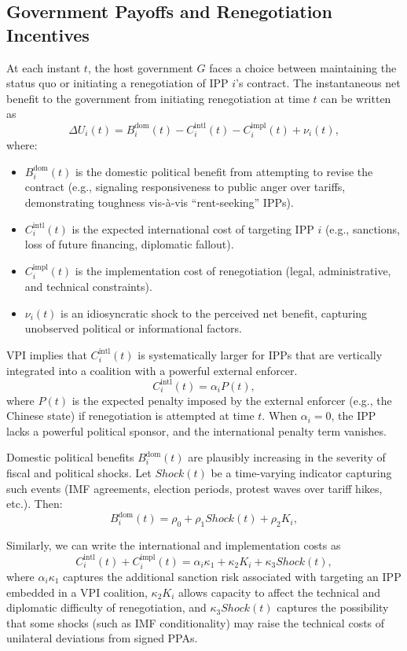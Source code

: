 \documentclass[12pt]{article}
\begin{document}
\subsection*{Government Payoffs and Renegotiation Incentives}

At each instant $t$, the host government $G$ faces a choice between maintaining the status quo or initiating a renegotiation of IPP $i$'s contract. The instantaneous net benefit to the government from initiating renegotiation at time $t$ can be written as
\[
  \Delta U_i(t) 
  = B^{\text{dom}}_i(t) - C^{\text{intl}}_i(t) - C^{\text{impl}}_i(t) + \nu_i(t),
\]
where:
\begin{itemize}
  \item $B^{\text{dom}}_i(t)$ is the domestic political benefit from attempting to revise the contract (e.g., signaling responsiveness to public anger over tariffs, demonstrating toughness vis-à-vis ``rent-seeking'' IPPs).
  \item $C^{\text{intl}}_i(t)$ is the expected international cost of targeting IPP $i$ (e.g., sanctions, loss of future financing, diplomatic fallout).
  \item $C^{\text{impl}}_i(t)$ is the implementation cost of renegotiation (legal, administrative, and technical constraints).
  \item $\nu_i(t)$ is an idiosyncratic shock to the perceived net benefit, capturing unobserved political or informational factors.
\end{itemize}

VPI implies that $C^{\text{intl}}_i(t)$ is systematically larger for IPPs that are vertically integrated into a coalition with a powerful external enforcer.
\[
  C^{\text{intl}}_i(t) = \alpha_i P(t),
\]
where $P(t)$ is the expected penalty imposed by the external enforcer (e.g., the Chinese state) if renegotiation is attempted at time $t$. When $\alpha_i = 0$, the IPP lacks a powerful political sponsor, and the international penalty term vanishes.

Domestic political benefits $B^{\text{dom}}_i(t)$ are plausibly increasing in the severity of fiscal and political shocks. Let $Shock(t)$ be a time-varying indicator capturing such events (IMF agreements, election periods, protest waves over tariff hikes, etc.). Then:
\[
  B^{\text{dom}}_i(t) = \rho_0 + \rho_1 Shock(t) + \rho_2 K_i,
\]

Similarly, we can write the international and implementation costs as
\[
  C^{\text{intl}}_i(t) + C^{\text{impl}}_i(t)
  = \alpha_i \kappa_1 + \kappa_2 K_i + \kappa_3 Shock(t),
\]
where $\alpha_i \kappa_1$ captures the additional sanction risk associated with targeting an IPP embedded in a VPI coalition, $\kappa_2 K_i$ allows capacity to affect the technical and diplomatic difficulty of renegotiation, and $\kappa_3 Shock(t)$ captures the possibility that some shocks (such as IMF conditionality) may raise the technical costs of unilateral deviations from signed PPAs.
\end{document}
